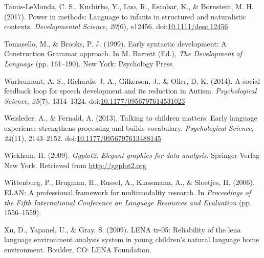 \documentclass[,man,floatsintext]{apa6}
\begin{document}
\hypertarget{ref-tamislemonda2017power}{}
Tamis-LeMonda, C. S., Kuchirko, Y., Luo, R., Escobar, K., \& Bornstein,
M. H. (2017). Power in methods: Language to infants in structured and
naturalistic contexts. \emph{Developmental Science}, \emph{20}(6),
e12456.
doi:\href{https://doi.org/10.1111/desc.12456}{10.1111/desc.12456}

\hypertarget{ref-tomasello1999early}{}
Tomasello, M., \& Brooks, P. J. (1999). Early syntactic development: A
Construction Grammar approach. In M. Barrett (Ed.), \emph{The
Development of Language} (pp. 161--190). New York: Psychology Press.

\hypertarget{ref-warlaumont2014social}{}
Warlaumont, A. S., Richards, J. A., Gilkerson, J., \& Oller, D. K.
(2014). A social feedback loop for speech development and its reduction
in Autism. \emph{Psychological Science}, \emph{25}(7), 1314--1324.
doi:\href{https://doi.org/10.1177/0956797614531023}{10.1177/0956797614531023}

\hypertarget{ref-weisleder2013talking}{}
Weisleder, A., \& Fernald, A. (2013). Talking to children matters: Early
language experience strengthens processing and builds vocabulary.
\emph{Psychological Science}, \emph{24}(11), 2143--2152.
doi:\href{https://doi.org/10.1177/0956797613488145}{10.1177/0956797613488145}

\hypertarget{ref-R-ggplot2}{}
Wickham, H. (2009). \emph{Ggplot2: Elegant graphics for data analysis}.
Springer-Verlag New York. Retrieved from \url{http://ggplot2.org}

\hypertarget{ref-ELAN}{}
Wittenburg, P., Brugman, H., Russel, A., Klassmann, A., \& Sloetjes, H.
(2006). ELAN: A professional framework for multimodality research. In
\emph{Proceedings of the Fifth International Conference on Language
Resources and Evaluation} (pp. 1556--1559).

\hypertarget{ref-xu2009reliability}{}
Xu, D., Yapanel, U., \& Gray, S. (2009). LENA tr-05: Reliability of the
lena language environment analysis system in young children's natural
language home environment. Boulder, CO: LENA Foundation.

\endgroup
\end{document}
